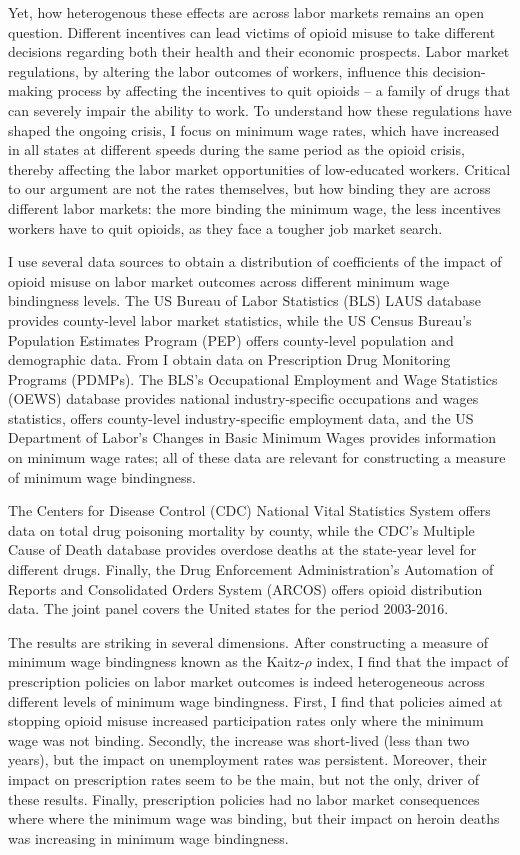 \documentclass[12pt,a4paper]{article}
\begin{document}
Yet, how heterogenous these effects are across labor markets remains an open question.
Different incentives can lead victims of opioid misuse to take different decisions regarding both their health and their economic prospects. 
Labor market regulations, by altering the labor outcomes of workers, influence this decision-making process by affecting the incentives to quit opioids -- a family of drugs that can severely impair the ability to work.
To understand how these regulations have shaped the ongoing crisis, I focus on minimum wage rates, which have increased in all states at different speeds during the same period as the opioid crisis, thereby affecting the labor market opportunities of low-educated workers.
Critical to our argument are not the rates themselves, but how binding they are across different labor markets: the more binding the minimum wage, the less incentives workers have to quit opioids, as they face a tougher job market search.

I use several data sources to obtain a distribution of coefficients of the impact of opioid misuse on labor market outcomes across different minimum wage bindingness levels.
The US Bureau of Labor Statistics (BLS) LAUS database provides county-level labor market statistics, while the US Census Bureau's Population Estimates Program (PEP) offers county-level population and demographic data.
From \textcite{Horwitz2021} I obtain data on Prescription Drug Monitoring Programs (PDMPs). 
The BLS's Occupational Employment and Wage Statistics (OEWS) database provides national industry-specific occupations and wages statistics, \textcite{Eckert2020} offers county-level industry-specific employment data, and the US Department of Labor's Changes in Basic Minimum Wages provides information on minimum wage rates; all of these data are relevant for constructing a measure of minimum wage bindingness.

The Centers for Disease Control (CDC) National Vital Statistics System offers data on total drug poisoning mortality by county, while the CDC's Multiple Cause of Death database provides overdose deaths at the state-year level for different drugs.
Finally, the Drug Enforcement Administration's Automation of Reports and Consolidated Orders System (ARCOS) offers opioid distribution data.
The joint panel covers the United states for the period 2003-2016.

The results are striking in several dimensions.
After constructing a measure of minimum wage bindingness known as the Kaitz-\(\rho\) index, I find that the impact of prescription policies on labor market outcomes is indeed heterogeneous across different levels of minimum wage bindingness.
First, I find that policies aimed at stopping opioid misuse increased participation rates only where the minimum wage was not binding.
Secondly, the increase was short-lived (less than two years), but the impact on unemployment rates was persistent.
Moreover, their impact on prescription rates seem to be the main, but not the only, driver of these results.
Finally, prescription policies had no labor market consequences where where the minimum wage was binding, but their impact on heroin deaths was increasing in minimum wage bindingness.
\end{document}

